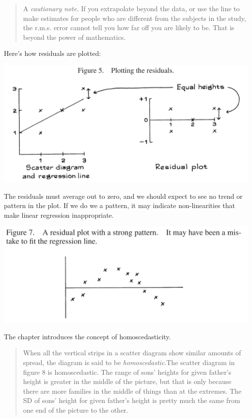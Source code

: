 \documentclass[
]{book}
\begin{document}
\begin{quote}
A \emph{cautionary note.} If you extrapolate beyond the data, or use the line to make estimates for people who are different from the subjects in the study, the r.m.s. error cannot tell you how far off you are likely to be. That is beyond the power of mathematics.
\end{quote}

Here's how residuals are plotted:

\includegraphics{images/Ch11Img02.png}

The residuals must average out to zero, and we should expect to see no trend or pattern in the plot. If we do we a pattern, it may indicate non-linearities that make linear regression inappropriate.

\includegraphics{images/Ch11Img03.png}

The chapter introduces the concept of homoscedasticity.

\begin{quote}
When all the vertical strips in a scatter diagram show similar amounts of spread, the diagram is said to be \emph{homoscedastic}.The scatter diagram in figure 8 is homoscedastic. The range of sons' heights for given father's height is greater in the middle of the picture, but that is only because there are more families in the middle of things than at the extremes. The SD of sons' height for given father's
height is pretty much the same from one end of the picture to the other.
\end{quote}
\end{document}
